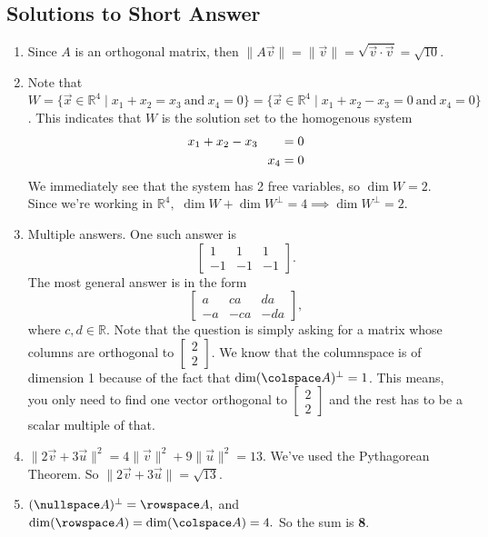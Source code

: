 \subsection{Solutions to Short Answer}
	\begin{enumerate}
		\item Since \(A\) is an orthogonal matrix, then \(\|A\vec{v}\| = \|\vec{v}\| = \sqrt{\vec{v} \cdot \vec{v}} = \sqrt{10}\).
		\item Note that \(W = \{\vec{x} \in \mathbb{R}^4 \mid x_1 + x_2 = x_3 \ \text{and} \ x_4 = 0\} = \{\vec{x} \in \mathbb{R}^4 \mid x_1 + x_2 - x_3 = 0 
			\ \text{and} \ x_4 = 0\}\). This indicates that \(W\) is the solution set to the homogenous system 
			\[\begin{aligned}
				x_1 + x_2 - x_3 \hphantom{+ x_4}  &= 0 \\
				                                            x_4   &= 0
			\end{aligned}\]
			We immediately see that the system has 2 free variables, so \(\dim W = 2\). Since we're working in \(\mathbb{R}^4, \) 
			\(\dim W + \dim W^\perp = 4 \implies \dim W^\perp = 2.\)
		\item Multiple answers. One such answer is \[\begin{bmatrix}1 & 1 & 1 \\ -1 & -1 & -1\end{bmatrix}.\] The most general answer is in the form 
			\[\begin{bmatrix}a & ca & da \\ -a & -ca & -da\end{bmatrix},\] where \(c, d \in \mathbb{R}.\) Note that the question is simply asking for
			a matrix whose columns are orthogonal to \(\begin{bmatrix}2 \\ 2\end{bmatrix}\). We know that the columnspace is of dimension 1 because
			of the fact that \(\dim (\colspace A)^\perp = 1\). This means, you only need to find one vector orthogonal to 
			\(\begin{bmatrix}2 \\ 2\end{bmatrix}\) and the rest has to be a scalar multiple of that.
		\item \(\|2\vec{v} + 3\vec{u}\|^2 = 4\|\vec{v}\|^2 + 9\|\vec{u}\|^2 = 13.\) We've used the Pythagorean Theorem. 
			So \(\|2\vec{v} + 3\vec{u}\| = \sqrt{13}\).
		\item \((\nullspace A)^\perp = \rowspace A,\) and \(\dim(\rowspace A) = \dim(\colspace A) = 4.\) So the sum is \textbf{8}. 

\end{enumerate}
